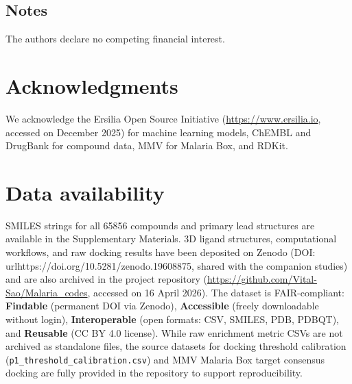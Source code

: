 \documentclass[journal=jcisd8,manuscript=article]{achemso}
\begin{document}
\subsection*{Notes}
The authors declare no competing financial interest.

\section*{Acknowledgments}
We acknowledge the Ersilia Open Source Initiative (\url{https://www.ersilia.io}, accessed on December 2025) for machine learning models, ChEMBL and DrugBank for compound data, MMV for Malaria Box, and RDKit.

\section*{Data availability}
SMILES strings for all \num{65856} compounds and primary lead structures are available in the Supplementary Materials. 3D ligand structures, computational workflows, and raw docking results have been deposited on Zenodo (DOI: \\url{https://doi.org/10.5281/zenodo.19608875}, shared with the companion studies) and are also archived in the project repository (\url{https://github.com/Vital-Sao/Malaria_codes}, accessed on 16 April 2026). The dataset is FAIR-compliant: \textbf{Findable} (permanent DOI via Zenodo), \textbf{Accessible} (freely downloadable without login), \textbf{Interoperable} (open formats: CSV, SMILES, PDB, PDBQT), and \textbf{Reusable} (CC BY 4.0 license). While raw enrichment metric CSVs are not archived as standalone files, the source datasets for docking threshold calibration (\texttt{p1\_threshold\_calibration.csv}) and MMV Malaria Box target consensus docking are fully provided in the repository to support reproducibility.


\end{document}
